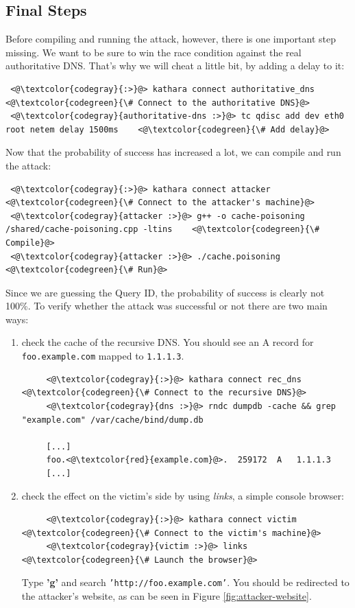 \documentclass[11pt,a4paper]{article}
\begin{document}
\subsection{Final Steps}
\noindent
Before compiling and running the attack, however, there is one important step missing. We want to be sure to win the race condition against the real authoritative DNS. That's why we will cheat a little bit, by adding a delay to it:
\begin{lstlisting}
 <@\textcolor{codegray}{:>}@> kathara connect authoritative_dns  <@\textcolor{codegreen}{\# Connect to the authoritative DNS}@>
 <@\textcolor{codegray}{authoritative-dns :>}@> tc qdisc add dev eth0 root netem delay 1500ms    <@\textcolor{codegreen}{\# Add delay}@>
\end{lstlisting}
\noindent
Now that the probability of success has increased a lot, we can compile and run the attack:
\begin{lstlisting}
 <@\textcolor{codegray}{:>}@> kathara connect attacker  <@\textcolor{codegreen}{\# Connect to the attacker's machine}@>
 <@\textcolor{codegray}{attacker :>}@> g++ -o cache-poisoning /shared/cache-poisoning.cpp -ltins    <@\textcolor{codegreen}{\# Compile}@>
 <@\textcolor{codegray}{attacker :>}@> ./cache.poisoning    <@\textcolor{codegreen}{\# Run}@>
\end{lstlisting}

\noindent
Since we are guessing the Query ID, the probability of success is clearly not 100\%. To verify whether the attack was successful or not there are two main ways:
\begin{enumerate}
    \item check the cache of the recursive DNS. You should see an A record for \texttt{foo.example.com} mapped to \texttt{1.1.1.3}.
    \begin{lstlisting}
     <@\textcolor{codegray}{:>}@> kathara connect rec_dns  <@\textcolor{codegreen}{\# Connect to the recursive DNS}@>
     <@\textcolor{codegray}{dns :>}@> rndc dumpdb -cache && grep "example.com" /var/cache/bind/dump.db     
     
     [...]
     foo.<@\textcolor{red}{example.com}@>.  259172  A   1.1.1.3
     [...]\end{lstlisting}
     \item check the effect on the victim's side by using \textit{links}, a simple console browser:
     \begin{lstlisting}
     <@\textcolor{codegray}{:>}@> kathara connect victim  <@\textcolor{codegreen}{\# Connect to the victim's machine}@>
     <@\textcolor{codegray}{victim :>}@> links    <@\textcolor{codegreen}{\# Launch the browser}@>\end{lstlisting}
     Type \textbf{'g'} and search \texttt{'http://foo.example.com'}. You should be redirected to the attacker's website, as can be seen in Figure \ref{fig:attacker-website}.
\end{enumerate}
\end{document}
